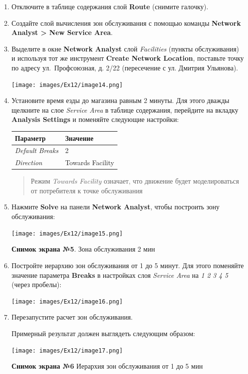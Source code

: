 \documentclass[12pt,]{book}
\begin{document}
\begin{enumerate}
\def\labelenumi{\arabic{enumi}.}
\item
  Отключите в таблице содержания слой \textbf{Route} (снимите галочку).
\item
  Создайте слой вычисления зон обслуживания с помощью команды \textbf{Network Analyst \textgreater{} New Service Area}.
\item
  Выделите в окне \textbf{Network Analyst} слой \emph{Facilities} (пункты обслуживания) и используя тот же инструмент \textbf{Create Network Location}, поставьте точку по адресу ул.~Профсоюзная, д. 2/22 (пересечение с ул. Дмитрия Ульянова).

  \texttt{[image: images/Ex12/image14.png]}
\item
  Установите время езды до магазина равным 2 минуты. Для этого дважды щелкните на слое \emph{Service Area} в таблице содержания, перейдите на вкладку \textbf{Analysis Settings} и поменяйте следующие настройки:

  \begin{longtable}[]{@{}ll@{}}
  \toprule
  Параметр & Значение\tabularnewline
  \midrule
  \endhead
  \emph{Default Breaks} & 2\tabularnewline
  \emph{Direction} & Towards Facility\tabularnewline
  \bottomrule
  \end{longtable}

  \begin{quote}
  Режим \emph{Towards Facility} означает, что движение будет моделироваться от потребителя к точке обслуживания
  \end{quote}
\item
  Нажмите \textbf{Solve} на панели \textbf{Network Analyst}, чтобы построить зону обслуживания:

  \texttt{[image: images/Ex12/image15.png]}

  \textbf{Снимок экрана №5}. Зона обслуживания 2 мин
\item
  Постройте иерархию зон обслуживания от 1 до 5 минут. Для этого поменяйте значение параметра \textbf{Breaks} в настройках слоя \emph{Service Area} на \emph{1 2 3 4 5} (через пробелы):

  \texttt{[image: images/Ex12/image16.png]}
\item
  Перезапустите расчет зон обслуживания.

  Примерный результат должен выглядеть следующим образом:

  \texttt{[image: images/Ex12/image17.png]}

  \textbf{Снимок экрана №6} Иерархия зон обслуживания от 1 до 5 мин
\end{enumerate}
\end{document}
